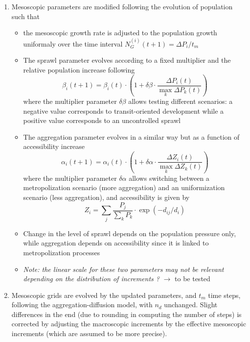 \documentclass[11pt]{article}
\begin{document}
\begin{enumerate}
	
	\item Mesoscopic parameters are modified following the evolution of population such that 
		\begin{itemize}
			\item the mesoscopic growth rate is adjusted to the population growth uniformaly over the time interval	
			    $N_G^{(i)} (t + 1) = \Delta P_i / t_m$
			\item The sprawl parameter evolves according to a fixed multiplier and the relative population increase following 
			\begin{equation}
				\beta_i (t+1) = \beta_i (t) \cdot \left(1 + \delta\beta \cdot \frac{\Delta P_i (t)}{\max_k  \Delta P_k (t)}\right)
			\end{equation}
			where the multiplier parameter $\delta\beta$ allows testing different scenarios: a negative value corresponds to transit-oriented development while a positive value corresponds to an uncontrolled sprawl
			\item The aggregation parameter evolves in a similar way but as a function of accessibility increase
			\begin{equation}
				\alpha_i (t+1) = \alpha_i (t) \cdot \left(1 + \delta\alpha \cdot \frac{\Delta Z_i (t)}{\max_k  \Delta Z_k (t)}\right)
			\end{equation}
			where the multiplier parameter $\delta\alpha$ allows switching between a metropolization scenario (more aggregation) and an uniformization scenario (less aggregation), and accessibility is given by
			\begin{equation}
				Z_i = \sum_j \frac{P_j}{\sum_k P_k} \cdot \exp( - d_{ij} / d_i)
			\end{equation}
			\item Change in the level of sprawl depends on the population pressure only, while aggregation depends on accessibility since it is linked to metropolization processes
			\item \textit{Note: the linear scale for these two parameters may not be relevant depending on the distribution of increments ?} $\rightarrow$ to be tested
		\end{itemize}
	
	\item Mesoscopic grids are evolved by the updated parameters, and $t_m$ time steps, following the aggregation-diffusion model, with $n_d$ unchanged. Slight differences in the end (due to rounding in computing the number of steps) is corrected by adjusting the macroscopic increments by the effective mesoscopic increments (which are assumed to be more precise).
	

\end{enumerate}
\end{document}
